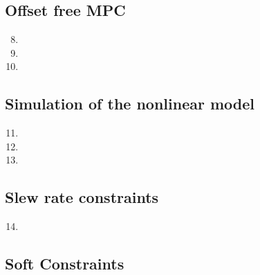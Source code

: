 \documentclass[11pt]{article}
\begin{document}


\subsection*{Offset free MPC} %
\label{sub:offset_free_mpc}

\begin{enumerate}
    \setcounter{enumi}{7}
    \item

    \item

    \item
\end{enumerate}



\subsection*{Simulation of the nonlinear model} %
\label{sub:simulation_of_the_nonlinear_model}

\begin{enumerate}
    \setcounter{enumi}{10}
    \item

    \item

    \item
\end{enumerate}



\subsection*{Slew rate constraints} %
\label{sub:slew_rate_constraints}

\begin{enumerate}
    \setcounter{enumi}{13}
    \item
\end{enumerate}



\subsection*{Soft Constraints} %
\label{sub:soft_constraints}
\end{document}
